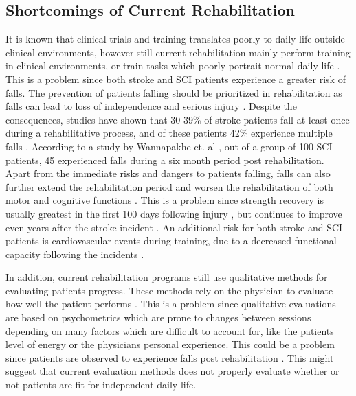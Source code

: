 
\subsection{Shortcomings of Current Rehabilitation}

It is known that clinical trials and training translates poorly to daily life outside clinical environments, however still current rehabilitation mainly perform training in clinical environments, or train tasks which poorly portrait normal daily life \cite{Basteris2014}.
This is a problem since both stroke and SCI patients experience a greater risk of falls. The prevention of patients falling should be prioritized in rehabilitation as falls can lead to loss of independence and serious injury \cite{Zehr2011}. Despite the consequences, studies have shown that 30-39\% of stroke patients fall at least once during a rehabilitative process, and of these patients 42\% experience multiple falls \cite{Bhalla2016, Hanger2014}. According to a study by Wannapakhe et. al \cite{Wannapakhe2015}, out of a group of 100 SCI patients, 45 experienced falls during a six month period post rehabilitation. %
Apart from the immediate risks and dangers to patients falling, falls can also further extend the rehabilitation period and worsen the rehabilitation of both motor and cognitive functions \cite{Wong2016, Blennerhassett2012}. This is a problem since strength recovery is usually greatest in the first 100 days following injury \cite{Weidner2017}, but continues to improve even years after the stroke incident \cite{Sun2015}. An additional risk for both stroke and SCI patients is cardiovascular events during training, due to a decreased functional capacity following the incidents \cite{Zehr2011}.

In addition, current rehabilitation programs still use qualitative methods for evaluating patients progress. These methods rely on the physician to evaluate how well the patient performs \cite{ANPT_SCI2018, ANPT_Stroke2018, Sullivan2013}. This is a problem since qualitative evaluations are based on psychometrics which are prone to changes between sessions depending on many factors which are difficult to account for, like the patients level of energy or the physicians personal experience. This could be a problem since patients are observed to experience falls post rehabilitation \cite{Bhalla2016, Hanger2014, Wannapakhe2015}. This might suggest that current evaluation methods does not properly evaluate whether or not patients are fit for independent daily life. 




